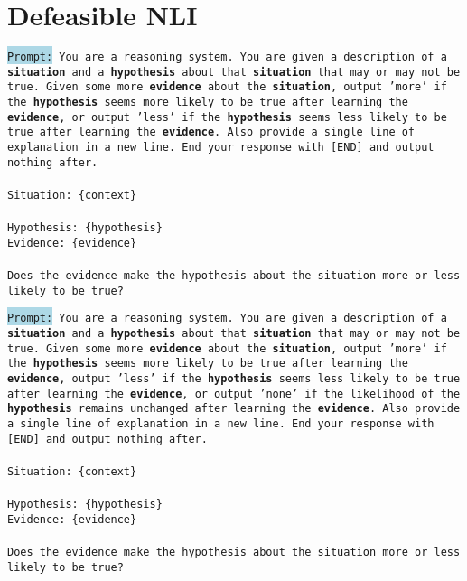 \section{Defeasible NLI}

\begin{prompt}[title={Prompt \thetcbcounter: Defeasible Inference}, label=prompt:defeasible]
\texttt{\colorbox{lightblue}{Prompt:} You are a reasoning system. You are given a description of a \textbf{situation} and a \textbf{hypothesis} about that \textbf{situation} that may or may not be true. Given some more \textbf{evidence} about the \textbf{situation}, output 'more' if the \textbf{hypothesis} seems more likely to be true after learning the \textbf{evidence}, or output 'less' if the \textbf{hypothesis} seems less likely to be true after learning the \textbf{evidence}. Also provide a single line of explanation in a new line. End your response with [END] and output nothing after.\\ \\Situation: \{context\}\\\\Hypothesis: \{hypothesis\}\\Evidence: \{evidence\}\\\\Does the evidence make the hypothesis about the situation more or less likely to be true?}
\end{prompt}

\begin{prompt}[title={Prompt \thetcbcounter: Defeasible Inference Atoms}, label=prompt:defeasible-atom]
\texttt{\colorbox{lightblue}{Prompt:} You are a reasoning system. You are given a description of a \textbf{situation} and a \textbf{hypothesis} about that \textbf{situation} that may or may not be true. Given some more \textbf{evidence} about the \textbf{situation}, output 'more' if the \textbf{hypothesis} seems more likely to be true after learning the \textbf{evidence}, output 'less' if the \textbf{hypothesis} seems less likely to be true after learning the \textbf{evidence}, or output 'none' if the likelihood of the \textbf{hypothesis} remains unchanged after learning the \textbf{evidence}. Also provide a single line of explanation in a new line. End your response with [END] and output nothing after.\\ \\Situation: \{context\}\\\\Hypothesis: \{hypothesis\}\\Evidence: \{evidence\}\\\\Does the evidence make the hypothesis about the situation more or less likely to be true?}
\end{prompt}


